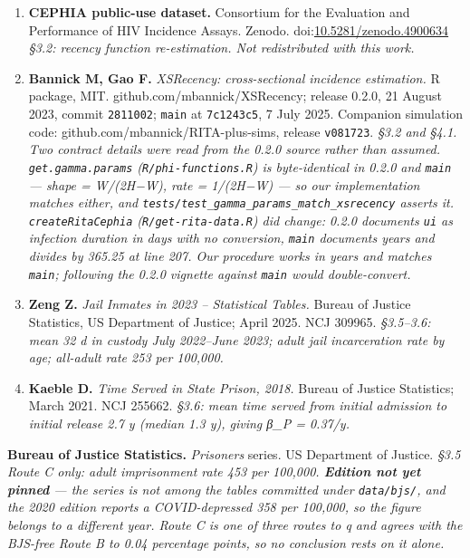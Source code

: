 \begin{enumerate}
\def\labelenumi{\arabic{enumi}.}
\setcounter{enumi}{17}
\item
  \textbf{CEPHIA public-use dataset.} Consortium for the Evaluation and Performance of HIV Incidence Assays. Zenodo. doi:\href{https://doi.org/10.5281/zenodo.4900634}{10.5281/zenodo.4900634}
  \emph{§3.2: recency function re-estimation. Not redistributed with this work.}
\item
  \textbf{Bannick M, Gao F.} \emph{XSRecency: cross-sectional incidence estimation.} R package, MIT. github.com/mbannick/XSRecency; release 0.2.0, 21 August 2023, commit \texttt{2811002}; \texttt{main} at \texttt{7c1243c5}, 7 July 2025. Companion simulation code: github.com/mbannick/RITA-plus-sims, release \texttt{v081723}. \emph{§3.2 and §4.1. Two contract details were read from the 0.2.0 source rather than assumed. \texttt{get.gamma.params} (\texttt{R/phi-functions.R}) is byte-identical in 0.2.0 and \texttt{main} --- shape = W/(2H−W), rate = 1/(2H−W) --- so our implementation matches either, and \texttt{tests/test\_gamma\_params\_match\_xsrecency} asserts it. \texttt{createRitaCephia} (\texttt{R/get-rita-data.R}) did change: 0.2.0 documents \texttt{ui} as infection duration in days with no conversion, \texttt{main} documents years and divides by 365.25 at line 207. Our procedure works in years and matches \texttt{main}; following the 0.2.0 vignette against \texttt{main} would double-convert.}
\item
  \textbf{Zeng Z.} \emph{Jail Inmates in 2023 -- Statistical Tables.} Bureau of Justice Statistics, US Department of Justice; April 2025. NCJ 309965. \emph{§3.5--3.6: mean 32 d in custody July 2022--June 2023; adult jail incarceration rate by age; all-adult rate 253 per 100,000.}
\item
  \textbf{Kaeble D.} \emph{Time Served in State Prison, 2018.} Bureau of Justice Statistics; March 2021. NCJ 255662. \emph{§3.6: mean time served from initial admission to initial release 2.7 y (median 1.3 y), giving β\_P = 0.37/y.}
\end{enumerate}

\textbf{Bureau of Justice Statistics.} \emph{Prisoners} series. US Department of Justice. \emph{§3.5 Route C only: adult imprisonment rate 453 per 100,000. \textbf{Edition not yet pinned} --- the series is not among the tables committed under \texttt{data/bjs/}, and the 2020 edition reports a COVID-depressed 358 per 100,000, so the figure belongs to a different year. Route C is one of three routes to q and agrees with the BJS-free Route B to 0.04 percentage points, so no conclusion rests on it alone.}

